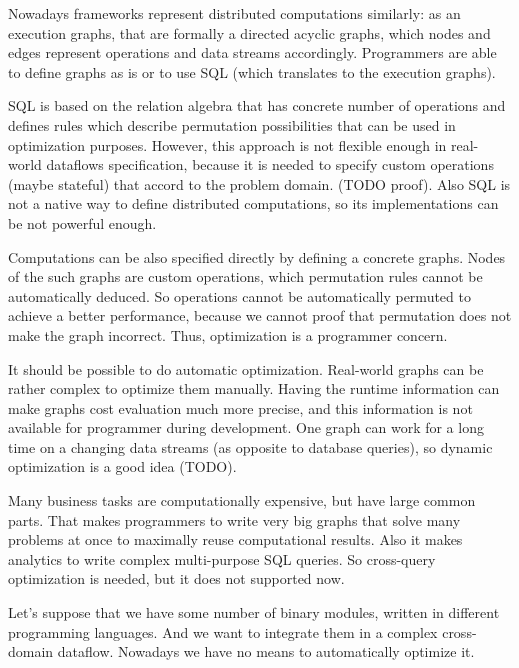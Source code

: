 Nowadays frameworks represent distributed computations similarly: as an execution graphs, that are formally a directed acyclic graphs, which nodes and edges represent operations and data streams accordingly.
Programmers are able to define graphs as is or to use SQL (which translates to the execution graphs).

SQL is based on the relation algebra that has concrete number of operations and defines rules which describe permutation possibilities that can be used in optimization purposes.
However, this approach is not flexible enough in real-world dataflows specification, because it is needed to specify custom operations (maybe stateful) that accord to the problem domain. (TODO proof).
Also SQL is not a native way to define distributed computations, so its implementations can be not powerful enough.

Computations can be also specified directly by defining a concrete graphs.
Nodes of the such graphs are custom operations, which permutation rules cannot be automatically deduced.
So operations cannot be automatically permuted to achieve a better performance, because we cannot proof that permutation does not make the graph incorrect.
Thus, optimization is a programmer concern.

It should be possible to do automatic optimization.
Real-world graphs can be rather complex to optimize them manually.
Having the runtime information can make graphs cost evaluation much more precise, and this information is not available for programmer during development.
One graph can work for a long time on a changing data streams (as opposite to database queries), so dynamic optimization is a good idea (TODO).

Many business tasks are computationally expensive, but have large common parts.
That makes programmers to write very big graphs that solve many problems at once to maximally reuse computational results.
Also it makes analytics to write complex multi-purpose SQL queries.
So cross-query optimization is needed, but it does not supported now.

Let's suppose that we have some number of binary modules, written in different programming languages.
And we want to integrate them in a complex cross-domain dataflow.
Nowadays we have no means to automatically optimize it.

